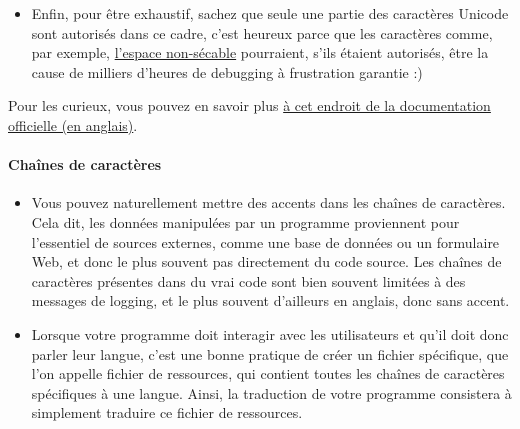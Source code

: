     \begin{itemize}
\tightlist
\item
  Enfin, pour être exhaustif, sachez que seule une partie des caractères
  Unicode sont autorisés dans ce cadre, c'est heureux parce que les
  caractères comme, par exemple,
  \href{http://www.fileformat.info/info/unicode/char/a0/index.htm}{l'espace
  non-sécable} pourraient, s'ils étaient autorisés, être la cause de
  milliers d'heures de debugging à frustration garantie :)
\end{itemize}

Pour les curieux, vous pouvez en savoir plus
\href{https://docs.python.org/3/reference/lexical_analysis.html\#identifiers}{à
cet endroit de la documentation officielle (en anglais)}.

    \hypertarget{chauxeenes-de-caractuxe8res}{%
\paragraph{Chaînes de caractères}\label{chauxeenes-de-caractuxe8res}}

    \begin{itemize}
\item
  Vous pouvez naturellement mettre des accents dans les chaînes de
  caractères. Cela dit, les données manipulées par un programme
  proviennent pour l'essentiel de sources externes, comme une base de
  données ou un formulaire Web, et donc le plus souvent pas directement
  du code source. Les chaînes de caractères présentes dans du vrai code
  sont bien souvent limitées à des messages de logging, et le plus
  souvent d'ailleurs en anglais, donc sans accent.
\item
  Lorsque votre programme doit interagir avec les utilisateurs et qu'il
  doit donc parler leur langue, c'est une bonne pratique de créer un
  fichier spécifique, que l'on appelle fichier de ressources, qui
  contient toutes les chaînes de caractères spécifiques à une langue.
  Ainsi, la traduction de votre programme consistera à simplement
  traduire ce fichier de ressources.
\end{itemize}

    \begin{Shaded}
\begin{Highlighting}[]
\OperatorTok{=} 
\end{Highlighting}
\end{Shaded}


